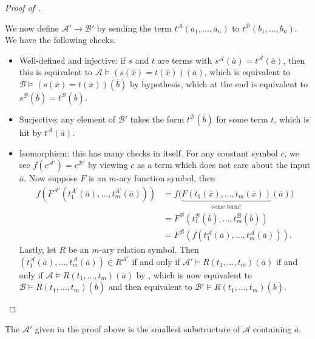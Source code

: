 \documentclass[../notes.tex]{subfiles}
\begin{document}
\begin{proof}[Proof of ]
\begin{itemize}
		We now define $\mathcal A'\to\mathcal B'$ by sending the term $t^\mathcal A(a_1,\ldots,a_n)$ to $t^\mathcal B(b_1,\ldots,b_n)$. We have the following checks.
		\begin{itemize}
			\item Well-defined and injective: if $s$ and $t$ are terms with $s^\mathcal A(\overline a)=t^\mathcal A(\overline a)$, then this is equivalent to $\mathcal A\models(s(\overline x)=t(\overline x))(\overline a)$, which is equivalent to $\mathcal B\models(s(\overline x)=t(\overline x))(\overline b)$ by hypothesis, which at the end is equivalent to $s^\mathcal B(\overline b)=t^\mathcal B(\overline b)$.
			\item Surjective: any element of $\mathcal B'$ takes the form $t^\mathcal B(\overline b)$ for some term $t$, which is hit by $t^\mathcal A(\overline a)$.
			\item Isomorphism: this has many checks in itself. For any constant symbol $c$, we see $f\left(c^{\mathcal A'}\right)=c^{\mathcal B'}$ by viewing $c$ as a term which does not care about the input $\overline a$. Now suppose $F$ is an $m$-ary function symbol, then
			\begin{align*}
				f\left(F^{\mathcal A'}(t_1^{\overline A'}(\overline a),\ldots,t_m^{\overline A'}(\overline a))\right) &= f\big(\underbrace{F(t_1(\overline x),\ldots,t_m(\overline x))}_{\text{some term!}}(\overline a)\big) \\
				&= F^\mathcal B(t_1^\mathcal B(\overline b),\ldots,t_m^\mathcal B(\overline b)) \\
				&= F^\mathcal B\left(f(t_1^\mathcal A(\overline a),\ldots,t_m^\mathcal A(\overline a))\right).
			\end{align*}
			Lastly, let $R$ be an $m$-ary relation symbol. Then $\left(t_1^\mathcal A(\overline a),\ldots,t_m^\mathcal A(\overline a)\right)\in R^{\mathcal A'}$ if and only if $\mathcal A'\models R(t_1,\ldots,t_m)(\overline a)$ if and only if $\mathcal A\models R(t_1,\ldots,t_m)(\overline a)$ by , which is now equivalent to $\mathcal B\models R(t_1,\ldots,t_m)(\overline b)$ and then equivalent to $\mathcal B'\models R(t_1,\ldots,t_m)(\overline b)$.
			\qedhere
		\end{itemize}
	\end{itemize}
\end{proof}
\begin{remark}
	The $\mathcal A'$ given in the proof above is the smallest substructure of $\mathcal A$ containing $\overline a$.
\end{remark}
\end{document}
